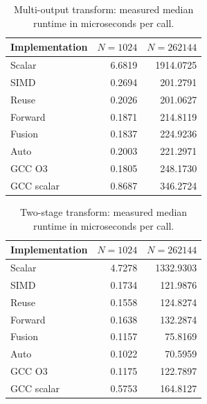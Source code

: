 \begin{table}[htbp]\centering\small

\caption{Multi-output transform: measured median runtime in microseconds per call.}

\begin{tabular}{lrr}\toprule

Implementation & $N=1024$ & $N=262144$ \\

\midrule

Scalar & 6.6819 & 1914.0725 \\

SIMD & 0.2694 & 201.2791 \\

Reuse & 0.2026 & 201.0627 \\

Forward & 0.1871 & 214.8119 \\

Fusion & 0.1837 & 224.9236 \\

Auto & 0.2003 & 221.2971 \\

GCC O3 & 0.1805 & 248.1730 \\

GCC scalar & 0.8687 & 346.2724 \\

\bottomrule\end{tabular}\end{table}

\begin{table}[htbp]\centering\small

\caption{Two-stage transform: measured median runtime in microseconds per call.}

\begin{tabular}{lrr}\toprule

Implementation & $N=1024$ & $N=262144$ \\

\midrule

Scalar & 4.7278 & 1332.9303 \\

SIMD & 0.1734 & 121.9876 \\

Reuse & 0.1558 & 124.8274 \\

Forward & 0.1638 & 132.2874 \\

Fusion & 0.1157 & 75.8169 \\

Auto & 0.1022 & 70.5959 \\

GCC O3 & 0.1175 & 122.7897 \\

GCC scalar & 0.5753 & 164.8127 \\

\bottomrule\end{tabular}\end{table}

